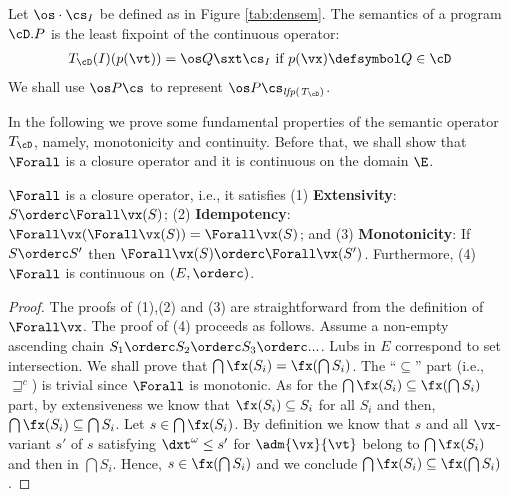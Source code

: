 \documentclass{tlp}
\begin{document}
\begin{definition}\label{def:conc-semantics}
Let $\os \cdot \cs_{I}$ be defined as in Figure \ref{tab:densem}. 
The semantics of a program $\cD.P$ is  the least fixpoint of the continuous 
operator:
\[
\begin{array}{lll}
 T_{\cD}(I)(p(\vt)) =  
\os Q\sxt \cs_{I} \mbox{ if } p(\vx) \defsymbol Q \in 
\cD
\end{array}
\]
We shall use $\os P  \cs$  to represent  $\os P \cs_{\it lfp(T_{\cD})}$.
\end{definition}




In the following we prove some fundamental properties of the semantic operator $ T_{\cD}$, namely, monotonicity and continuity. Before that, 
we shall show that  $\Forall$ is a closure operator and it is continuous on the domain $\E$.  

\begin{lemma}\label{lem:prop-for-all}
$\Forall$ is a closure operator, i.e., it satisfies (1) {\bf Extensivity}: $S \orderc \Forall \vx(S) $; (2) {\bf Idempotency}: $\Forall \vx (\Forall \vx (S)) = \Forall \vx(S)$; and (3)  {\bf Monotonicity}: If $S \orderc S'$ then $\Forall \vx(S) \orderc \Forall \vx(S')$. 
Furthermore,  (4)  $\Forall$ is continuous on $(E,\orderc)$.
\end{lemma}
\begin{proof}
The proofs of (1),(2) and (3) are straightforward from the definition of   $\Forall \vx$. The proof of (4) proceeds as follows. Assume a non-empty ascending chain $S_1 \orderc S_2 \orderc S_3 \orderc ...$.
Lubs in $E$ correspond to set intersection.
We shall prove that $\bigcap \fx (S_i) = \fx (\bigcap S_i)$.
The ``$\subseteq$'' part (i.e., $\sqsupseteq^c$) is trivial since $\Forall$ is monotonic. As for the $\bigcap \fx (S_i) \subseteq  \fx (\bigcap S_i)$ part, by extensiveness we know that $\fx(S_i) \subseteq S_i$ for all $S_i$ and then, $\bigcap \fx(S_i) \subseteq \bigcap S_i$. Let $s \in \bigcap \fx(S_i)$. By definition we know that $s$   and all $\vx$-variant $s'$ of $s$ satisfying $\dxt^\omega \leq s'$ for $\adm{\vx}{\vt}$ belong to  $\bigcap \fx(S_i)$ and then in $\bigcap S_i$. Hence, $s \in \fx(\bigcap S_i)$ and we conclude
$\bigcap \fx (S_i) \subseteq  \fx (\bigcap S_i)$.
\end{proof}
\end{document}
